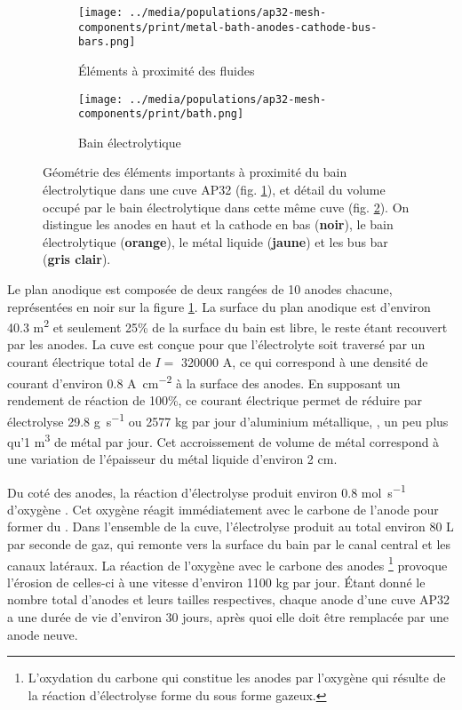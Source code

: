 \begin{figure}[t]
  \begin{center}
    \begin{subfigure}[b]{0.49\textwidth}
      \texttt{[image: ../media/populations/ap32-mesh-components/print/metal-bath-anodes-cathode-bus-bars.png]}
      \caption{Éléments à proximité des fluides}
      \label{fig:ap32-geometry-elements}
    \end{subfigure}
%
    \begin{subfigure}[b]{0.49\textwidth}
      \texttt{[image: ../media/populations/ap32-mesh-components/print/bath.png]}
      \caption{Bain électrolytique}
      \label{fig:ap32-geometry-electrolyte}
    \end{subfigure}
%
    \caption{Géométrie des éléments importants à proximité
      du bain électrolytique dans une cuve AP32
      (fig. \ref{fig:ap32-geometry-elements}), et détail du volume
      occupé par le bain électrolytique dans cette même cuve
      (fig. \ref{fig:ap32-geometry-electrolyte}). On distingue
      les anodes en haut et la cathode
      en bas (\textbf{noir}), le bain électrolytique
      (\textbf{orange}), le métal liquide (\textbf{jaune}) et les
      bus bar (\textbf{gris clair}).}
    \label{fig:ap32-geometry}
  \end{center}
\end{figure}

Le plan anodique est composée de deux rangées de 10 anodes chacune,
représentées en noir sur la figure \ref{fig:ap32-geometry-elements}. La
surface du plan anodique est d'environ \num{40.3} \si{\square\meter}
et seulement \num{25}\% de la surface du bain est libre, le reste
étant recouvert par les anodes. La cuve est conçue pour que
l'électrolyte soit traversé par un courant électrique total de $I = $
\num{320000} \si{\ampere}, ce qui correspond à une densité de courant
d'environ \num{0.8} \si{\ampere\per\square\centi\meter} à la surface
des anodes. En supposant un rendement de réaction de \num{100}\%, ce
courant électrique permet de réduire par électrolyse \num{29.8}
\si{\gram\per\second} ou \num{2577} \si{\kilo\gram} par jour
d'aluminium métallique, \ie, un peu plus qu'\num{1} \si{\cubic\meter}
de métal par jour. Cet accroissement de volume de métal correspond à
une variation de l'épaisseur du métal liquide d'environ \num{2}
\si{\centi\meter}.

Du coté des anodes, la réaction d'électrolyse produit environ
\num{0.8} \si{\mol\per\second} d'oxygène . Cet oxygène réagit
immédiatement avec le carbone de l'anode pour former du . Dans
l'ensemble de la cuve, l'électrolyse produit au total environ \num{80}
\si{\liter} par seconde de gaz, qui remonte vers la surface du bain
par le canal central et les canaux latéraux. La réaction de l'oxygène
avec le carbone des anodes \footnote{L'oxydation du carbone qui
  constitue les anodes par l'oxygène qui résulte de la réaction
  d'électrolyse forme du  sous forme gazeux.} provoque
l'érosion de celles-ci à une vitesse d'environ \num{1100}
\si{\kilo\gram} par jour. Étant donné le nombre total d'anodes et leurs
tailles respectives, chaque anode d'une cuve AP32 a une durée de vie
d'environ 30 jours, après quoi elle doit être remplacée par une anode
neuve.

